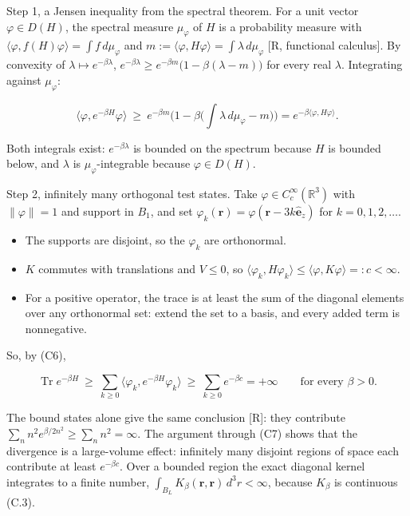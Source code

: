 \documentclass[11pt,a4paper]{article}
\newcommand{\tagmark}[1]{\marginnote{\scriptsize\ttfamily #1}}
\providecommand{\tightlist}{\setlength{\itemsep}{0pt}\setlength{\parskip}{0pt}}
\begin{document}
\tagmark{[D]} Step 1, a Jensen inequality from the spectral theorem. For a unit vector \(\varphi\in D(H)\), the spectral measure \(\mu_\varphi\) of \(H\) is a probability measure with \(\langle\varphi,f(H)\varphi\rangle=\int f\,d\mu_\varphi\) and \(m:=\langle\varphi,H\varphi\rangle=\int\lambda\,d\mu_\varphi\) {[}R, functional calculus{]}. By convexity of \(\lambda\mapsto e^{-\beta\lambda}\), \(e^{-\beta\lambda}\ge e^{-\beta m}\big(1-\beta(\lambda-m)\big)\) for every real \(\lambda\). Integrating against \(\mu_\varphi\):

\begin{equation}
\langle\varphi,e^{-\beta H}\varphi\rangle\ \ge\ e^{-\beta m}\Big(1-\beta\Big(\int\lambda\,d\mu_\varphi-m\Big)\Big)=e^{-\beta\langle\varphi,H\varphi\rangle}.\tag{C6}
\end{equation}

Both integrals exist: \(e^{-\beta\lambda}\) is bounded on the spectrum because \(H\) is bounded below, and \(\lambda\) is \(\mu_\varphi\)-integrable because \(\varphi\in D(H)\).

\tagmark{[D]} Step 2, infinitely many orthogonal test states. Take \(\varphi\in C_c^\infty(\mathbb R^3)\) with \(\|\varphi\|=1\) and support in \(B_1\), and set \(\varphi_k(\mathbf r)=\varphi(\mathbf r-3k\hat{\mathbf e}_z)\) for \(k=0,1,2,\dots\).

\begin{itemize}
\tightlist
\item
  The supports are disjoint, so the \(\varphi_k\) are orthonormal.
\item
  \(K\) commutes with translations and \(V\le0\), so \(\langle\varphi_k,H\varphi_k\rangle\le\langle\varphi,K\varphi\rangle=:c<\infty\).
\item
  For a positive operator, the trace is at least the sum of the diagonal elements over any orthonormal set: extend the set to a basis, and every added term is nonnegative.
\end{itemize}

So, by (C6),

\begin{equation}
\operatorname{Tr}e^{-\beta H}\ \ge\ \sum_{k\ge0}\langle\varphi_k,e^{-\beta H}\varphi_k\rangle\ \ge\ \sum_{k\ge0}e^{-\beta c}=+\infty\qquad\text{for every }\beta>0.\tag{C7}
\end{equation}

The bound states alone give the same conclusion {[}R{]}: they contribute \(\sum_nn^2e^{\beta/2n^2}\ge\sum_nn^2=\infty\). The argument through (C7) shows that the divergence is a large-volume effect: infinitely many disjoint regions of space each contribute at least \(e^{-\beta c}\). Over a bounded region the exact diagonal kernel integrates to a finite number, \(\int_{B_L}K_\beta(\mathbf r,\mathbf r)\,d^3r<\infty\), because \(K_\beta\) is continuous (C.3).
\end{document}
